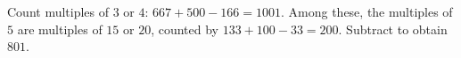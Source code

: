 Count multiples of $3$ or $4$: $667+500-166=1001$. Among these, the multiples of $5$ are multiples of $15$ or $20$, counted by $133+100-33=200$. Subtract to obtain $\boxed{801}$.
